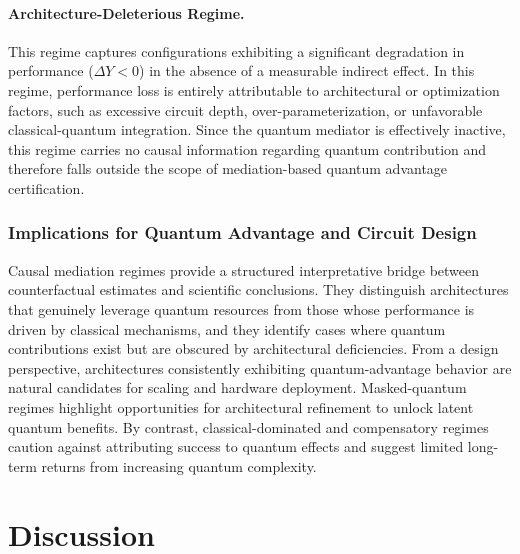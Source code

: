 \documentclass[
    reprint,
    amsmath, amssymb,
    aps,
    floatfix,
    nofootinbib
]{revtex4-1}
\begin{document}
\paragraph{Architecture-Deleterious Regime.} This regime captures configurations exhibiting a significant degradation in performance ($\Delta Y < 0$) in the absence of a measurable indirect effect. In this regime, performance loss is entirely attributable to architectural or optimization factors, such as excessive circuit depth, over-parameterization, or unfavorable classical-quantum integration. Since the quantum mediator is effectively inactive, this regime carries no causal information regarding quantum contribution and therefore falls outside the scope of mediation-based quantum advantage certification.

\subsubsection{Implications for Quantum Advantage and Circuit Design}

Causal mediation regimes provide a structured interpretative bridge between counterfactual estimates and scientific conclusions. They distinguish architectures that genuinely leverage quantum resources from those whose performance is driven by classical mechanisms, and they identify cases where quantum contributions exist but are obscured by architectural deficiencies.
From a design perspective, architectures consistently exhibiting quantum-advantage behavior are natural candidates for scaling and hardware deployment. Masked-quantum regimes highlight opportunities for architectural refinement to unlock latent quantum benefits.\cite{larocca2025barren, gil2024relation} By contrast, classical-dominated and compensatory regimes caution against attributing success to quantum effects and suggest limited long-term returns from increasing quantum complexity.

\section{Discussion}
\end{document}
